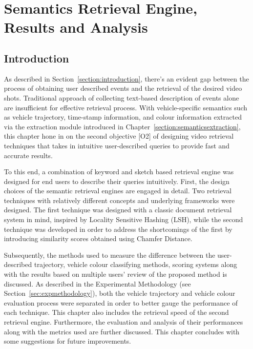 
\chapter{Semantics Retrieval Engine, Results and Analysis}

\label{section:retrievalengine}
\section{Introduction}

As described in Section~\ref{section:introduction}, there's an evident gap
between the process of obtaining user described events and the retrieval of the
desired video shots. Traditional approach of collecting text-based description
of events alone are insufficient for effective retrieval process.
With vehicle-specific semantics such as vehicle trajectory, time-stamp
information, and colour information extracted via the extraction module
introduced in Chapter~\ref{section:semanticsextraction},
this chapter hone in on the second objective [O2] of designing video retrieval
techniques that takes in intuitive user-described queries to provide fast
and accurate results.

To this end, a combination of keyword and sketch based retrieval engine was
designed for end users to describe their queries intuitively.
First, the design choices of the semantic retrieval engines are engaged in
detail. Two retrieval techniques with relatively different concepts and
underlying frameworks were designed.
The first technique was designed with a classic document retrieval system in
mind, inspired by Locality Sensitive Hashing (LSH), while the second technique
was developed in order to address the shortcomings of the first by introducing
similarity scores obtained using Chamfer Distance.

Subsequently, the methods used to measure the difference between the
user-described trajectory, vehicle colour classifying methods, scoring systems
along with the results based on multiple users' review of the proposed method
is discussed.
As described in the Experimental Methodology (see Section~\ref{sec:expmethodology}),
both the vehicle trajectory and vehicle colour evaluation process were
separated in order to better gauge the performance of each technique.
This chapter also includes the retrieval speed of the second retrieval engine.
Furthermore, the evaluation and analysis of their performances along with the
metrics used are further discussed. This chapter concludes with some
suggestions for future improvements.

